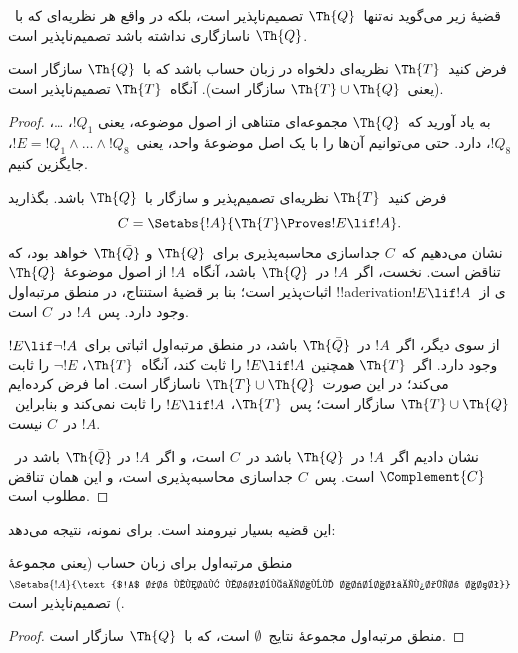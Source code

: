 \documentclass[../../../include/open-logic-section]{subfiles}
\begin{document}


قضیهٔ زیر می‌گوید نه‌تنها~$\Th{Q}$ تصمیم‌ناپذیر است، بلکه در واقع هر
نظریه‌ای که با~$\Th{Q}$ ناسازگاری نداشته باشد تصمیم‌ناپذیر است.

\begin{thm}
فرض کنید~$\Th{T}$ نظریه‌ای دلخواه در زبان حساب باشد که با~$\Th{Q}$
سازگار است (یعنی~$\Th{T} \cup \Th{Q}$ سازگار است). آنگاه~$\Th{T}$
تصمیم‌ناپذیر است.
\end{thm}

\begin{proof}
به یاد آورید که~$\Th{Q}$ مجموعه‌ای متناهی از اصول موضوعه، یعنی
$!Q_1$، \dots، $!Q_8$، دارد. حتی می‌توانیم آن‌ها را با یک اصل موضوعهٔ
واحد، یعنی~$!E = !Q_1 \land \dots \land !Q_8$، جایگزین کنیم.

فرض کنید~$\Th{T}$ نظریه‌ای تصمیم‌پذیر و سازگار با~$\Th{Q}$ باشد. بگذارید
\[
C = \Setabs{!A}{\Th{T} \Proves !E \lif !A}.
\]
نشان می‌دهیم که~$C$ جداسازی محاسبه‌پذیری برای~$\Th{Q}$ و
$\Th{\bar Q}$ خواهد بود، که تناقض است. نخست، اگر~$!A$ در~$\Th{Q}$
باشد، آنگاه~$!A$ از اصول موضوعهٔ~$\Th{Q}$ اثبات‌پذیر است؛ بنا بر قضیهٔ
استنتاج، در منطق مرتبه‌اول !!a{derivation}ی از~$!E \lif !A$ وجود دارد.
پس~$!A$ در~$C$ است.

از سوی دیگر، اگر~$!A$ در~$\Th{\bar Q}$ باشد، در منطق مرتبه‌اول اثباتی
برای~$!E \lif \lnot !A$ وجود دارد. اگر~$\Th{T}$ همچنین
$!E \lif !A$ را ثابت کند، آنگاه~$\Th{T}$، $\lnot !E$ را ثابت می‌کند؛
در این صورت~$\Th{T} \cup \Th{Q}$ ناسازگار است. اما فرض کرده‌ایم
$\Th{T} \cup \Th{Q}$ سازگار است؛ پس~$\Th{T}$، $!E \lif !A$ را ثابت
نمی‌کند و بنابراین~$!A$ در~$C$ نیست.

نشان دادیم اگر~$!A$ در~$\Th{Q}$ باشد در~$C$ است، و اگر~$!A$ در
$\Th{\bar Q}$ باشد در~$\Complement{C}$ است. پس~$C$ جداسازی
محاسبه‌پذیری است، و این همان تناقض مطلوب است.
\end{proof}

این قضیه بسیار نیرومند است. برای نمونه، نتیجه می‌دهد:

\begin{cor}
  منطق مرتبه‌اول برای زبان حساب (یعنی مجموعهٔ
  $\Setabs{!A}{\text{$!A$ در منطق مرتبه‌اول اثبات‌پذیر است}}$)
  تصمیم‌ناپذیر است.
\end{cor}

\begin{proof}
منطق مرتبه‌اول مجموعهٔ نتایج~$\emptyset$ است، که با~$\Th{Q}$ سازگار
است.
\end{proof}
\end{document}
